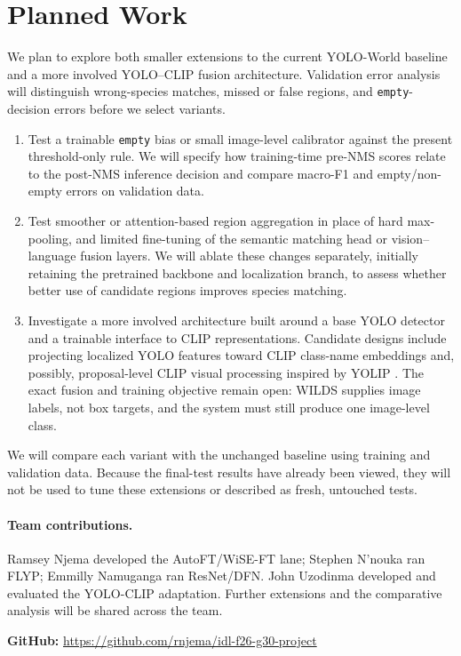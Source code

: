 \documentclass{article}
\begin{document}
\section{Planned Work}
We plan to explore both smaller extensions to the current YOLO-World baseline and a
more involved YOLO--CLIP fusion architecture. Validation error analysis will
distinguish wrong-species matches, missed or false regions, and
\texttt{empty}-decision errors before we select variants.
\begin{enumerate}
\item Test a trainable \texttt{empty} bias or small image-level calibrator against
the present threshold-only rule. We will specify how training-time pre-NMS scores
relate to the post-NMS inference decision and compare macro-F1 and
empty/non-empty errors on validation data.
\item Test smoother or attention-based region aggregation in place of hard
max-pooling, and limited fine-tuning of the semantic matching head or
vision--language fusion layers. We will ablate these changes separately, initially
retaining the pretrained backbone and localization branch, to assess whether
better use of candidate regions improves species matching.
\item Investigate a more involved architecture built around a base YOLO detector
and a trainable interface to CLIP representations. Candidate designs include
projecting localized YOLO features toward CLIP class-name embeddings and, possibly,
proposal-level CLIP visual processing inspired by YOLIP \citep{hu2026yolip}.
The exact fusion and training objective remain open: WILDS supplies image labels,
not box targets, and the system must still produce one image-level class.
\end{enumerate}
We will compare each variant with the unchanged baseline using training and
validation data. Because the final-test results have already been viewed, they
will not be used to tune these extensions or described as fresh, untouched tests.

\paragraph{Team contributions.}
Ramsey Njema developed the AutoFT/WiSE-FT lane; Stephen N'nouka ran FLYP; Emmilly
Namuganga ran ResNet/DFN. John Uzodinma developed and evaluated the YOLO-CLIP
adaptation. Further extensions and the comparative analysis will be shared across
the team.

\noindent\textbf{GitHub:}
\url{https://github.com/rnjema/idl-f26-g30-project}



\end{document}
